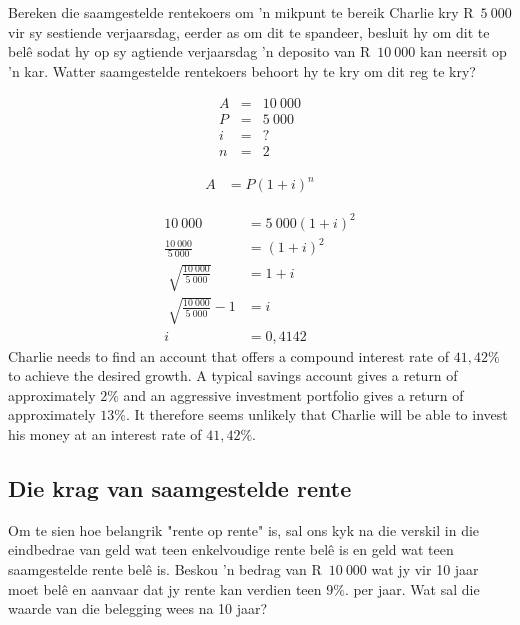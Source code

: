 \begin{wex}{Bereken die saamgestelde rentekoers om 'n mikpunt te bereik}
{Charlie kry R~$5~000$ vir sy sestiende verjaarsdag, eerder as om dit te spandeer, besluit hy om dit te bel\^e sodat hy op sy agtiende verjaarsdag 'n deposito van R~$10~000$ kan neersit op 'n kar. Watter saamgestelde rentekoers behoort hy te kry om dit reg te kry?}
{
    \begin{eqnarray*}
	A &=& 10~000\\
	P &=& 5~000\\
	i &=& ?\\
	n &=& 2
    \end{eqnarray*}

    \begin{align*}
	A &= P(1 + i)^n
    \end{align*}

    \begin{align*}
	10~000 &= 5~000(1 + i)^2\\
	\frac{10~000}{5~000}&= (1 +i)^2\\
	\sqrt[]{\frac{10~000}{5~000}} &= 1 + i\\
	\sqrt[]{\frac{10~000}{5~000}} - 1 &= i\\
	i &= 0,4142
    \end{align*}
    Charlie needs to find an account that offers a compound interest
    rate of $41,42\%$ to achieve the desired growth.  A typical
    savings account gives a return of approximately $2\%$ and an
    aggressive investment portfolio gives a return of approximately
    $13\%$. It therefore seems unlikely that Charlie will be able to
    invest his money at an interest rate of $41,42\%$.
} 
\end{wex}


\subsection{Die krag van saamgestelde rente}

Om te sien hoe belangrik "rente op rente" is, sal ons kyk na die verskil in die eindbedrae van geld wat teen
enkelvoudige rente belê is en geld wat teen saamgestelde rente belê is. Beskou ’n bedrag van R~$10~000$  wat jy
vir 10 jaar moet belê en aanvaar dat jy rente kan verdien teen $9\%$. per jaar. Wat sal die waarde van die belegging
wees na 10 jaar?\par


